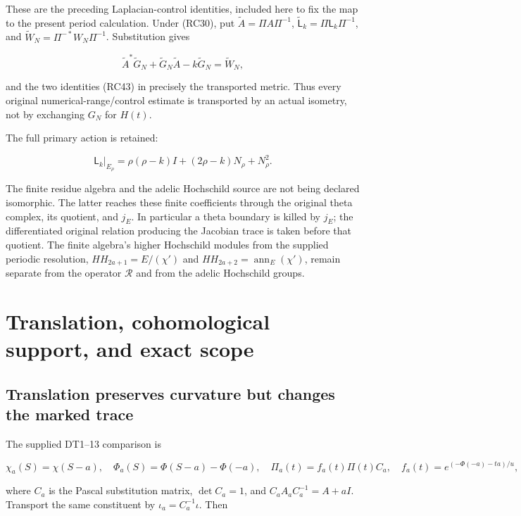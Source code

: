 \documentclass[
  11pt,
]{article}
\begin{document}
These are the preceding Laplacian-control identities, included here to
fix the map to the present period calculation. Under (RC30), put
\(\widetilde A=\Pi A\Pi^{-1}\),
\(\widetilde{\mathsf L}_k=\Pi\mathsf L_k\Pi^{-1}\), and
\(\widetilde W_N=\Pi^{-*}W_N\Pi^{-1}\). Substitution gives

\[
\widetilde A^*\widetilde G_N+
\widetilde G_N\widetilde A-k\widetilde G_N=\widetilde W_N,
\tag{RC44}
\]

and the two identities (RC43) in precisely the transported metric. Thus
every original numerical-range/control estimate is transported by an
actual isometry, not by exchanging \(G_N\) for \(H(t)\).

The full primary action is retained:

\[
\mathsf L_k|_{E_\rho}
=\rho(\rho-k)I+(2\rho-k)N_\rho+N_\rho^2.
\tag{RC45}
\]

The finite residue algebra and the adelic Hochschild source are not
being declared isomorphic. The latter reaches these finite coefficients
through the original theta complex, its quotient, and \(j_E\). In
particular a theta boundary is killed by \(j_E\); the differentiated
original relation producing the Jacobian trace is taken before that
quotient. The finite algebra's higher Hochschild modules from the
supplied periodic resolution, \(HH_{2a+1}=E/(\chi')\) and
\(HH_{2a+2}=\operatorname{ann}_E(\chi')\), remain separate from the
operator \(\mathcal R\) and from the adelic Hochschild groups.

\section{Translation, cohomological support, and exact
scope}\label{translation-cohomological-support-and-exact-scope}

\subsection{Translation preserves curvature but changes the marked
trace}\label{translation-preserves-curvature-but-changes-the-marked-trace}

The supplied DT1--13 comparison is

\[
\chi_a(S)=\chi(S-a),\quad
\Phi_a(S)=\Phi(S-a)-\Phi(-a),\quad
\Pi_a(t)=f_a(t)\Pi(t)C_a,
\quad f_a(t)=e^{(-\Phi(-a)-ta)/u},
\tag{RC46}
\]

where \(C_a\) is the Pascal substitution matrix, \(\det C_a=1\), and
\(C_aA_aC_a^{-1}=A+aI\). Transport the same constituent by
\(\iota_a=C_a^{-1}\iota\). Then
\end{document}
